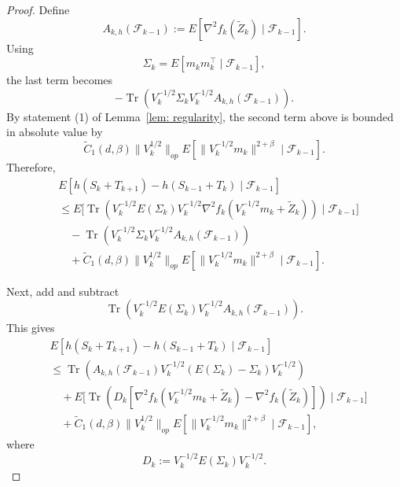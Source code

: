 \documentclass[10pt,a4paper]{amsart}
\begin{document}
\begin{proof}
Define
\[
    A_{k,h}(\mathcal F_{k-1})
    :=
    E\left[
    \nabla^2 f_k(\widetilde Z_k)
    \mid
    \mathcal F_{k-1}
    \right].
\]
Using
\[
    \Sigma_k=E[m_km_k^\top\mid\mathcal F_{k-1}],
\]
the last term becomes
\[
    -
    \operatorname{Tr}\left(
    V_k^{-1/2}\Sigma_k V_k^{-1/2}
    A_{k,h}(\mathcal F_{k-1})
    \right).
\]
By statement (1) of Lemma~\ref{lem: regularity}, the second term above is
bounded in absolute value by
\[
\tilde C_1(d,\beta)\|V_k^{1/2}\|_{op}
E\left[
\|V_k^{-1/2}m_k\|^{2+\beta}
\mid
\mathcal F_{k-1}
\right].
\]
Therefore,
\begin{align*}
& E\left[
h(S_k+T_{k+1})-h(S_{k-1}+T_k)
\mid
\mathcal F_{k-1}
\right]
\\
&\le
E\biggl[
\operatorname{Tr}\left(
V_k^{-1/2}E(\Sigma_k)V_k^{-1/2}
\nabla^2 f_k\left(V_k^{-1/2}m_k+\widetilde Z_k\right)
\right)
\mid
\mathcal F_{k-1}
\biggr]
\\
&\quad
-
\operatorname{Tr}\left(
V_k^{-1/2}\Sigma_k V_k^{-1/2}
A_{k,h}(\mathcal F_{k-1})
\right)
\\
&\quad
+
\tilde C_1(d,\beta)\|V_k^{1/2}\|_{op}
E\left[
\|V_k^{-1/2}m_k\|^{2+\beta}
\mid
\mathcal F_{k-1}
\right].
\end{align*}

Next, add and subtract
\[
\operatorname{Tr}\left(
V_k^{-1/2}E(\Sigma_k)V_k^{-1/2}
A_{k,h}(\mathcal F_{k-1})
\right).
\]
This gives
\begin{align*}
& E\left[
h(S_k+T_{k+1})-h(S_{k-1}+T_k)
\mid
\mathcal F_{k-1}
\right]
\\
&\le
\operatorname{Tr}\left(
A_{k,h}(\mathcal F_{k-1})
V_k^{-1/2}
\left(E(\Sigma_k)-\Sigma_k\right)
V_k^{-1/2}
\right)
\\
&\quad
+
E\biggl[
\operatorname{Tr}\left(
D_k
\left[
\nabla^2 f_k\left(V_k^{-1/2}m_k+\widetilde Z_k\right)
-
\nabla^2 f_k(\widetilde Z_k)
\right]
\right)
\mid
\mathcal F_{k-1}
\biggr]
\\
&\quad
+
\tilde C_1(d,\beta)\|V_k^{1/2}\|_{op}
E\left[
\|V_k^{-1/2}m_k\|^{2+\beta}
\mid
\mathcal F_{k-1}
\right],
\end{align*}
where
\[
    D_k:=V_k^{-1/2}E(\Sigma_k)V_k^{-1/2}.
\]


\end{proof}
\end{document}
